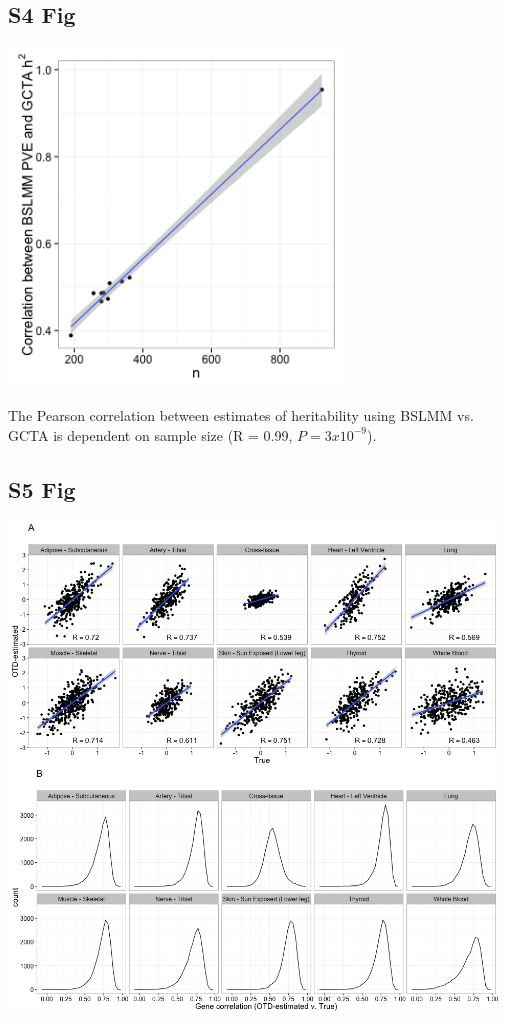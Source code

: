 \documentclass[10pt,letterpaper]{article}
\begin{document}
\begin{singlespace}
\subsection*{S4 Fig}
\includegraphics[width=9cm]{Figures/Fig-R_gcta_bslmm_v_n.png}
\label{S4_Fig}

 The Pearson correlation between estimates of heritability using BSLMM vs. GCTA is dependent on sample size (R = 0.99, $P = 3 x 10^{-9}$).

\subsection*{S5 Fig}
\includegraphics[width=13cm]{Figures/sim_v_obs_SLTM_ALL.png}
\label{S5_Fig}


\end{singlespace}
\end{document}
